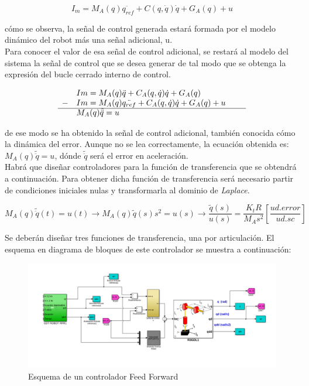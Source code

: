 \begin{equation}
I_m= M_{A}(q)\ddot{q_{ref}} + C(q,\dot{q})\dot{q} + G_{A}(q) + u
\end{equation}

cómo se observa, la señal de control generada estará formada por el modelo dinámico del robot más una señal adicional, u.\\

Para conocer el valor de esa señal de control adicional, se restará al modelo del sistema la señal de control que se desea generar de tal modo que se obtenga la expresión del bucle cerrado interno de control.

\begin{equation}
\begin{array}{llll}
& Im=M_{A}(q)\ddot{q} + C_{A}(q,\dot{q})\dot{q} + G_{A}(q) \\

- & Im=M_{A}(q)\ddot{q_{ref}} + C_{A}(q,\dot{q})\dot{q} + G_{A}(q) + u \\

\cline{1-4}

& M_{A}(q)\tilde{\ddot{q}} = u & &
\end{array}
\end{equation}

de ese modo se ha obtenido la señal de control adicional, también conocida cómo la dinámica del error. Aunque no se lea correctamente, la ecuación obtenida es: $M_{A}(q)\tilde{\ddot{q}} = u$, dónde $\tilde{\ddot{q}}$ será el error en aceleración. \\

Habrá que diseñar controladores para la función de transferencia que se obtendrá a continuación. Para obtener dicha función de transferencia será necesario partir de condiciones iniciales nulas y transformarla al dominio de \textit{Laplace}.

\begin{equation}
M_{A}(q)\tilde{\ddot{q}}(t) = u(t) \rightarrow M_{A}(q)\tilde{q}(s)s^{2} = u(s) \rightarrow \frac{\tilde{q}(s)}{u(s)}=\frac{K_{t}R}{M_{A}s^{2}}[\frac{ud.error}{ud.sc}]
\end{equation}

Se deberán diseñar tres funciones de transferencia, una por articulación. El esquema en diagrama de bloques de este controlador se muestra a continuación:



\begin{figure}[h!]
	\centering
	\includegraphics[width=.8\textwidth]{montaje_feedforward}
	\caption{Esquema de un controlador Feed Forward}

\end{figure}

